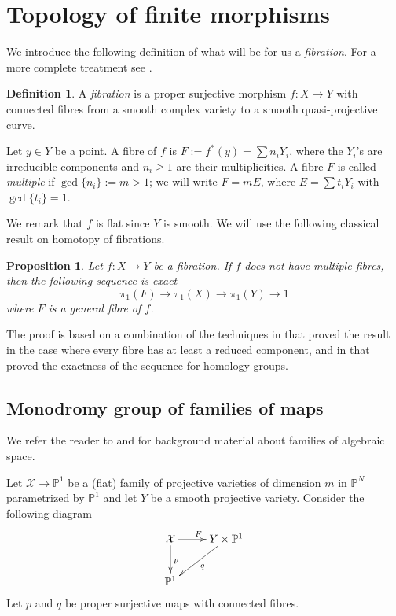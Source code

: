 \documentclass[12pt,a4paper,twoside,leqno,noamsfonts]{amsart}
\newtheorem{prop}[cor]{Proposition}
\theoremstyle{definition}
\newtheorem{defn}[cor]{Definition}
\newcommand{\bP}{\mathbb{P}}
\newcommand{\cX}{\mathcal{X}}
\begin{document}
\section{Topology of finite morphisms}\label{sec3}
We introduce the following definition of what will be for us a \emph{fibration}. For a more complete treatment see \cite[Chapter III sect. 8]{BHPVdV}.
\begin{defn}
A \emph{fibration} is a proper surjective morphism $f: X \to Y$ with connected fibres from a smooth complex variety to a smooth quasi-projective curve. 

Let $y \in Y$ be a point. A fibre of $f$ is $F:=f^*(y)=\sum n_iY_i$, where the $Y_i$'s are irreducible components and $n_i \geq 1$ are their multiplicities. A fibre $F$ is called \emph{multiple} if $\gcd\{n_i\}:=m>1$; we will write $F=mE$, where $E=\sum t_iY_i$ with $\gcd\{t_i\}=1$. 
\end{defn}
We remark that $f$ is flat since $Y$ is smooth. 
We will use the following classical result on homotopy of fibrations. 
\begin{prop}\label{lem:Noriprelim}
Let $f: X \to Y$ be a fibration. If $f$ does not have multiple fibres, then the following sequence is exact
 \begin{equation*}
     \pi_1(F) \to \pi_1(X)\to \pi_1(Y)\to 1      
    \end{equation*}
where $F$ is a general fibre of $f$. 
\end{prop}
The proof is based on a combination of the techniques in \cite[Lemma 1.5]{Nori} that proved the result in the case where every fibre has at least a reduced component, and in \cite{Serrano} that proved the exactness of the sequence for homology groups.  



\subsection{Monodromy group of families of maps} \label{sec:limit}
We refer the reader to \cite[ChapterIII.9]{Hartshorne} and \cite[Chapter4.6.7]{Sernesi} for background material about families of algebraic space.

Let $\cX \to \bP^1$ be a (flat) family of projective varieties of dimension $m$ in $\bP^N$ parametrized by $\bP^1$ and let $Y$ be a smooth projective variety. Consider the following diagram
\begin{equation*}
    \xymatrix{
    \cX \ar[r]^F \ar[d]^p & Y \times \bP^1 \ar[dl]^q \\
    \bP^1 & }
\end{equation*}
Let $p$ and $q$ be proper surjective maps with connected fibres. 
\end{document}
